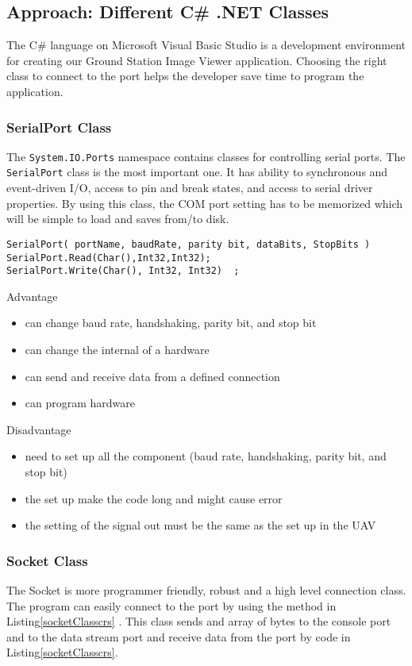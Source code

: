 \subsection{Approach: Different C\# .NET Classes}
The C\# language on Microsoft Visual Basic Studio is a development environment for creating our Ground Station Image Viewer application. Choosing the right class to connect to the port helps the developer save time to program the application. 
 
\subsubsection{SerialPort Class}
The \texttt{System.IO.Ports} namespace contains classes for controlling serial ports. 
The \texttt{SerialPort} class is the most important one. It has ability to synchronous and event-driven I/O, access to pin and break states, and access to serial driver properties\cite{peak_netFrame}. 
By using this class, the COM port setting has to be memorized which will be simple to load and saves from/to disk.

\begin{lstlisting}[caption=Serial Port class connection\, read and write method, label=serialPortconn]
SerialPort( portName, baudRate, parity bit, dataBits, StopBits ) 
SerialPort.Read(Char(),Int32,Int32);
SerialPort.Write(Char(), Int32, Int32)	;
\end{lstlisting}


Advantage 
\begin{itemize}
\item can change baud rate, handshaking, parity bit, and stop bit
\item can change the internal of a hardware
\item can send and receive data from a defined connection
\item can program hardware
\end{itemize}
Disadvantage
\begin{itemize}
\item need to set up all the component (baud rate, handshaking, parity bit, and stop bit)
\item the set up make the code long and might cause error
\item the setting of the signal out must be the same as the set up in the UAV
\end{itemize}

\subsubsection{Socket Class}
The Socket is more programmer friendly, robust and a high level connection class. 
The program can easily connect to the port by using the method in Listing\ref{socketClasscrs} .
This class sends and array of bytes to the console port and to the data stream port and receive data from the port by code in Listing\ref{socketClasscrs}.

